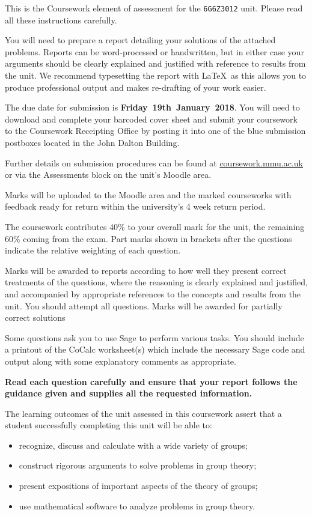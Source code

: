\documentclass[oneside,10pt]{amsart}
\newcommand{\logo}{\marginpar{\vskip -1mm \texttt{[image: mmulogo.png]}}}
\begin{document}
{}

This is the Coursework element of assessment for the \texttt{6G6Z3012} unit. Please read all these instructions carefully.

You will need to prepare a report detailing your solutions of the attached problems. Reports can be word-processed or handwritten, but in either case your arguments should be clearly explained and justified with reference to results from the unit. We recommend typesetting the report with \LaTeX\ as this allows you to produce professional output and makes re-drafting of your work easier.

The due date for submission is {\bfseries Friday~19th~January~2018}. You will need to download and complete your barcoded cover sheet and submit your coursework to the Coursework Receipting Office by posting it into one of the blue submission postboxes located in the John Dalton Building.

Further details on submission procedures can be found at \url{coursework.mmu.ac.uk} or via the Assessments block on the unit's Moodle area.

Marks will be uploaded to the Moodle area and the marked courseworks with feedback ready for return within the university's 4 week return period.

The coursework contributes 40\% to your overall mark for the unit, the remaining 60\% coming from the exam. Part marks shown in brackets after the questions indicate the relative weighting of each question.

Marks will be awarded to reports according to how well they present correct treatments of the questions, where the reasoning is clearly explained and justified, and accompanied by appropriate references to the concepts and results from the unit. You should attempt all questions. Marks will be awarded for partially correct solutions

Some questions ask you to use Sage to perform various tasks. You should include a printout of the CoCalc worksheet(s) which include the necessary Sage code and output along with some explanatory comments as appropriate.

\textbf{Read each question carefully and ensure that your report follows the guidance given and supplies all the requested information.}

The learning outcomes of the unit assessed in this coursework assert that a student successfully completing this unit will be able to:
\begin{itemize}
\item
recognize, discuss and calculate with a wide variety of groups;
\item
construct rigorous arguments to solve problems in group theory;
\item
present expositions of important aspects of the theory of groups;
\item
use mathematical software to analyze problems in group theory.
\end{itemize}
\end{document}

